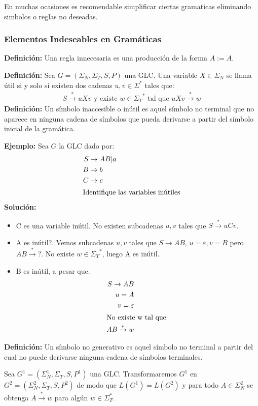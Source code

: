 En muchas ocasiones es recomendable simplificar ciertas gramaticas eliminando simbolos o reglas no deseadas.

\subsubsection{Elementos Indeseables en Gramáticas}
\textbf{Definición: }Una regla innecesaria es una producción de la forma $A:=A$.

\textbf{Definición: }Sea $G=(\Sigma_N,\Sigma_T,S,P)$ una GLC. Una variable $X\in \Sigma_N$ se llama útil si y solo si existen dos cadenas $u,v\in\Sigma^*$ tales que:
\begin{align*}
S	\xrightarrow{*} uXv \mbox{ y existe } w\in{\Sigma_T}^* \mbox{ tal que } uXv\xrightarrow{*}w
\end{align*}
\textbf{Definición: }Un símbolo inaccesible o inútil es aquel símbolo no terminal que no aparece en ninguna cadena de símbolos que pueda derivarse a partir del símbolo inicial de la gramática.

\textbf{Ejemplo: }Sea $G$ la GLC dado por:
\begin{align*}
S	&\rightarrow AB|a	\\
B	&\rightarrow b	\\
C	&\rightarrow c	\\
\intertext{Identifique las variables inútiles}
\end{align*}
\textbf{Solución: }
\begin{itemize}
\item C es una variable inútil. No existen subcadenas $u,v$ tales que $S\xrightarrow{*}uCv$.
\item A es inútil?. Vemos subcadenas $u,v$ tales que $S\rightarrow AB$, $u=\varepsilon,v=B$ pero $AB\xrightarrow{*}$?. No existe $w\in{\Sigma_T}^*$, luego A es inútil.
\item B es inútil, a pesar que.
\begin{align*}
S\rightarrow AB	\\
u=A	\\
v=\varepsilon\\
\intertext{No existe w tal que }
AB\xrightarrow{*} w
\end{align*}
\end{itemize}

\textbf{Definición: }Un símbolo no generativo es aquel símbolo no terminal a partir del cual no puede derivarse ninguna cadena de símbolos terminales.

Sea $G^1 =(\Sigma_N^1, \Sigma_T, S, P^1)$ una GLC. Transformaremos $G^1$ en $G^2=(\Sigma_N^2, \Sigma_T, S, P^2)$ de modo que $L(G^1)=L(G^2)$ y para todo $A\in\Sigma_N^2$ se obtenga $A\xrightarrow{*}w$ para algún $w\in\Sigma_T^*$.

